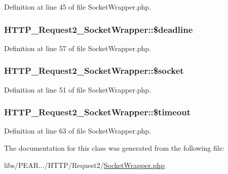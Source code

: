 Definition at line 45 of file Socket\+Wrapper.\+php.

\subsubsection[{\texorpdfstring{\$deadline}{$deadline}}]{\setlength{\rightskip}{0pt plus 5cm}H\+T\+T\+P\+\_\+\+Request2\+\_\+\+Socket\+Wrapper\+::\$deadline\hspace{0.3cm}{\ttfamily [protected]}}\hypertarget{classHTTP__Request2__SocketWrapper_a60fb3c60ee5ae016778114722bba86e4}{}\label{classHTTP__Request2__SocketWrapper_a60fb3c60ee5ae016778114722bba86e4}


Definition at line 57 of file Socket\+Wrapper.\+php.

\subsubsection[{\texorpdfstring{\$socket}{$socket}}]{\setlength{\rightskip}{0pt plus 5cm}H\+T\+T\+P\+\_\+\+Request2\+\_\+\+Socket\+Wrapper\+::\$socket\hspace{0.3cm}{\ttfamily [protected]}}\hypertarget{classHTTP__Request2__SocketWrapper_a76f6510956270cea38ea1ea23387a7fe}{}\label{classHTTP__Request2__SocketWrapper_a76f6510956270cea38ea1ea23387a7fe}


Definition at line 51 of file Socket\+Wrapper.\+php.

\subsubsection[{\texorpdfstring{\$timeout}{$timeout}}]{\setlength{\rightskip}{0pt plus 5cm}H\+T\+T\+P\+\_\+\+Request2\+\_\+\+Socket\+Wrapper\+::\$timeout\hspace{0.3cm}{\ttfamily [protected]}}\hypertarget{classHTTP__Request2__SocketWrapper_a1ad0716141ad4c8eaa0da661a4471fe7}{}\label{classHTTP__Request2__SocketWrapper_a1ad0716141ad4c8eaa0da661a4471fe7}


Definition at line 63 of file Socket\+Wrapper.\+php.



The documentation for this class was generated from the following file\+:\begin{DoxyCompactItemize}
\item 
libs/\+P\+E\+A\+R.../\+H\+T\+T\+P/\+Request2/\hyperlink{SocketWrapper_8php}{Socket\+Wrapper.\+php}\end{DoxyCompactItemize}
